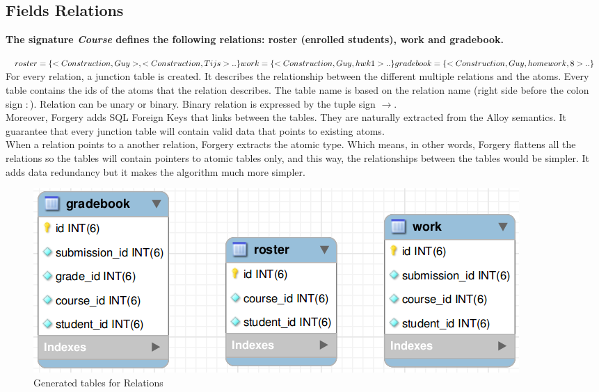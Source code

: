 \documentclass[oneside]{book}
\begin{document}
\newpage
\subsection{Fields Relations}
\textbf{The signature \textit{Course} defines the following relations: roster (enrolled students), work and gradebook.}

\noindent$roster = \{<Construction, Guy>, <Construction, Tijs>..\}\\
work = \{<Construction, Guy, hwk1>.. \}\\
gradebook = \{<Construction, Guy, homework, 8> ..\}$\\

\noindent For every relation, a junction table is created. It describes the relationship between the different multiple relations and the atoms.
Every table contains the ids of the atoms that the relation describes. The table name is based on the relation name (right side before the colon sign $:$). Relation can be unary or binary. Binary relation is expressed by the tuple sign $\rightarrow$.\\

\noindent Moreover, Forgery adds SQL Foreign Keys that links between the tables. They are naturally extracted from the Alloy semantics. It guarantee that every junction table will contain valid data that points to existing atoms.\\

\noindent When a relation points to a another relation, Forgery extracts the atomic type. Which means, in other words, Forgery flattens all the relations so the tables will contain pointers to atomic tables only, and this way, the relationships between the tables would be simpler. It adds data redundancy but it makes the algorithm much more simpler.

\begin{figure}[h!]
\centering
\includegraphics[scale=0.5]{2}
\caption{Generated tables for Relations}
\end{figure}
\end{document}
